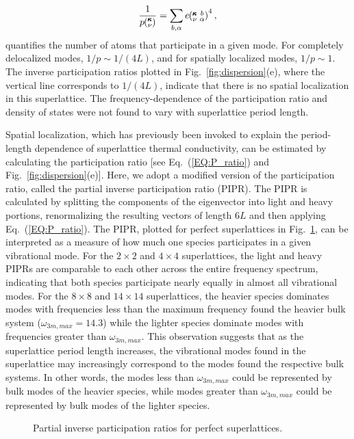 \documentclass[aps,prb,preprint,preprintnumbers,amsmath,amssymb,floatfix,superscriptaddress]{revtex4}
\newcommand{\kvba}{\mspace{-4.0mu}\left(\mspace{-8.0mu}
\begin{smallmatrix} &\pmb{\kappa} &b \\ &\nu &\alpha\end{smallmatrix}
\mspace{-3.0mu}\right)}
\newcommand{\kv}{\mspace{-4.0mu}\left(\mspace{-8.0mu}
\begin{smallmatrix}&\pmb{\kappa} \\&\nu\end{smallmatrix}
\mspace{-3.0mu}\right)}
\begin{document}
\begin{equation}\label{EQ:P_ratio}
\begin{split}
\frac{1}{p\kv}=\sum_{b,\alpha}e\kvba^4,
\end{split}
\end{equation}
quantifies the number of atoms that participate in a given mode. For completely delocalized modes, $1/p\sim 1/(4L)$, and for spatially localized modes, $1/p\sim 1$.\cite{PhysRevB.70.235214} The inverse participation ratios plotted in Fig.~\ref{fig:dispersion}(e), where the vertical line corresponds to $1/(4L)$, indicate that there is no spatial localization in this superlattice. The frequency-dependence of the participation ratio and density of states were not found to vary with superlattice period length.

Spatial localization, which has previously been invoked to explain the period-length dependence of superlattice thermal conductivity, \cite{PhysRevB.61.3091} can be estimated by calculating the participation ratio [see Eq.~(\ref{EQ:P_ratio}) and Fig.~\ref{fig:dispersion}(e)]. Here, we adopt a modified version of the participation ratio, called the partial inverse participation ratio (PIPR). The PIPR is calculated by splitting the components of the eigenvector into light and heavy portions, renormalizing the resulting vectors of length $6L$ and then applying Eq.~(\ref{EQ:P_ratio}). The PIPR, plotted for perfect superlattices in Fig.~\ref{FIG:ipnum}, can be interpreted as a measure of how much one species participates in a given vibrational mode. For the $2 \times 2$ and $4 \times 4$ superlattices, the light and heavy PIPRs are comparable to each other across the entire frequency spectrum, indicating that both species participate nearly equally in almost all vibrational modes. For the $8 \times 8$ and $14 \times 14$ superlattices, the heavier species dominates modes with frequencies less than the maximum frequency found the heavier bulk system ($\omega_{3m,max}=14.3$) while the lighter species dominate modes with frequencies greater than $\omega_{3m,max}$. This observation suggests that as the superlattice period length increases, the vibrational modes found in the superlattice may increasingly correspond to the modes found the respective bulk systems. In other words, the modes less than $\omega_{3m,max}$ could be represented by bulk modes of the heavier species, while modes greater than $\omega_{3m,max}$ could be represented by bulk modes of the lighter species. 
\begin{figure}[h!]
\begin{center}
\renewcommand{\figure}{Fig.}
\caption{Partial inverse participation ratios for perfect superlattices.}
\label{FIG:ipnum}
\end{center}
\end{figure}
\end{document}
